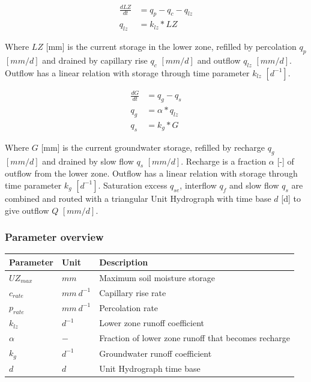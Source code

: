 \begin{align}
	\frac{dLZ}{dt} &= q_p - q_c - q_{lz}\\
	q_{lz} &= k_{lz}*LZ 
\end{align}

Where $LZ$ [mm] is the current storage in the lower zone, refilled by percolation $q_p$ $[mm/d]$ and drained by capillary rise $q_c$ $[mm/d]$ and outflow $q_{lz}$ $[mm/d]$.
Outflow has a linear relation with storage through time parameter $k_{lz}$ $[d^{-1}]$.

\begin{align}
	\frac{dG}{dt} &= q_g-q_s\\
	q_g &= \alpha*q_{lz} \\
	q_s &= k_g*G
\end{align}
  
Where $G$ [mm] is the current groundwater storage, refilled by recharge $q_g$ $[mm/d]$ and drained by slow flow $q_s$ $[mm/d]$.
Recharge is a fraction $\alpha$ [-] of outflow from the lower zone.
Outflow has a linear relation with storage through time parameter $k_{g}$ $[d^{-1}]$.
Saturation excess $q_{se}$, interflow $q_f$ and slow flow $q_s$ are combined and routed with a triangular Unit Hydrograph with time base $d$ [d] to give outflow $Q$ $[mm/d]$.

\subsubsection*{Parameter overview}
\begin{table}[htbp]
  \centering

    \begin{tabular}{lll}
    \toprule
    Parameter & Unit  & Description \\
    \midrule
    $UZ_{max}$ & $mm$    & Maximum soil moisture storage \\
    $c_{rate}$ & $mm~d^{-1}$ & Capillary rise rate \\
    $p_{rate}$ & $mm~d^{-1}$ & Percolation rate \\
    $k_{lz}$ & $d^{-1}$ & Lower zone runoff coefficient \\
    $\alpha$ & $-$     & Fraction of lower zone runoff that becomes recharge \\
    $k_g$   & $d^{-1}$ & Groundwater runoff coefficient \\
    $d$     & $d$     & Unit Hydrograph time base \\
    \bottomrule
    \end{tabular}%
  \label{tab:addlabel}%
\end{table}%

